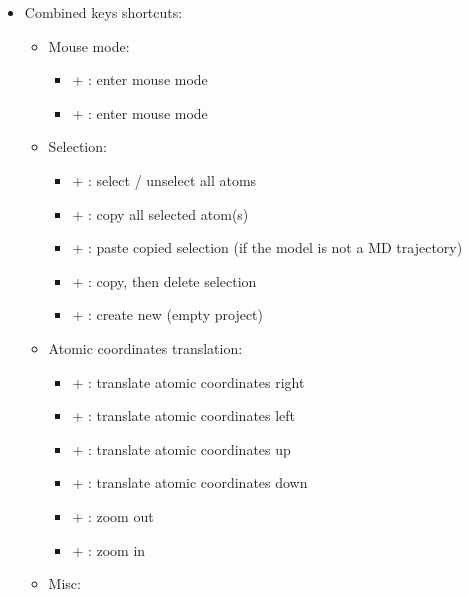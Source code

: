 {\begin{itemize}
\begin{itemize}
\begin{itemize}
\item[] \UArrow : rotate atomic coordinates up
\item[] \DArrow : rotate atomic coordinates down 
\end{itemize}
\item Misc:
\begin{itemize}
\item[] \Esc : exit fullscreen mode
\item[] \Del : Delete all selected atom(s)
\end{itemize}
\end{itemize}
\item Combined keys shortcuts:
\begin{itemize}
\item Mouse mode:
\begin{itemize}
\item[] \Alt +  : enter mouse  mode
\item[] \Alt +  : enter mouse  mode 
\end{itemize}
\item Selection:
\begin{itemize}
\item[] \Ctrl +  : select / unselect all atoms
\item[] \Ctrl +  : copy all selected atom(s)
\item[] \Ctrl +  : paste copied selection (if the model is not a MD trajectory)
\item[] \Ctrl +  : copy, then delete selection
\item[] \Ctrl +  : create new (empty project) 
\end{itemize}
\item Atomic coordinates translation:
\begin{itemize}
\item[] \Ctrl + \RArrow : translate atomic coordinates right
\item[] \Ctrl + \LArrow : translate atomic coordinates left
\item[] \Ctrl + \UArrow : translate atomic coordinates up
\item[] \Ctrl + \DArrow : translate atomic coordinates down
\item[] \Shift + \UArrow : zoom out
\item[] \Shift + \DArrow : zoom in \\
\end{itemize}
\item Misc:

\end{itemize}
\end{itemize}}
